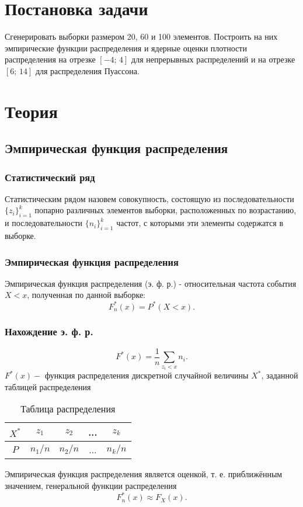 \documentclass[a4paper]{article}
\begin{document}
    
    \tableofcontents
    \newpage
	\listoffigures
    \newpage
\section {Постановка задачи}
\noindent Сгенерировать выборки размером 20, 60 и 100 элементов. Построить на них эмпирические функции распределения и ядерные оценки плотности распределения на отрезке $[-4;\,4]$ для непрерывных распределений и на отрезке $[6;\,14]$ для распределения Пуассона.

\section {Теория}
\subsection{Эмпирическая функция распределения}
\subsubsection{Статистический ряд}
\noindent Статистическим рядом назовем совокупность, состоящую из последовательности $\displaystyle\{z_i\}_{i=1}^k$ попарно различных элементов выборки, расположенных по возрастанию, и последовательности $\displaystyle\{n_i\}_{i=1}^k$ частот, с которыми эти элементы содержатся в выборке.
\subsubsection{Эмпирическая функция распределения}
\noindent Эмпирическая функция распределения (э. ф. р.) - относительная частота события $X < x$, полученная по данной выборке:
\begin{equation}
    F_n^*(x)=P^*(X<x).
\end{equation}
\subsubsection{Нахождение э. ф. р.}
\begin{equation}
    F^*(x)=\frac{1}{n}\sum_{z_i<x}n_i.
\end{equation}
$F^*(x)-$ функция распределения дискретной случайной величины $X^*$, заданной таблицей распределения
\begin{table}[H]
    \centering
    \begin{tabular}{|c|c|c|c|c|}
        \hline
         $X^*$&$z_1$&$z_2$&...&$z_k$\\
         \hline
         $P$&$n_1/n$&$n_2/n$&...&$n_k/n$\\
         \hline
    \end{tabular}
    \caption{Таблица распределения}
    \label{tab:my_label}
\end{table}
\noindent Эмпирическая функция распределения является оценкой, т. е. приближённым значением, генеральной функции распределения
\begin{equation}
    F_n^*(x)\approx F_X(x).
\end{equation}
\end{document}
